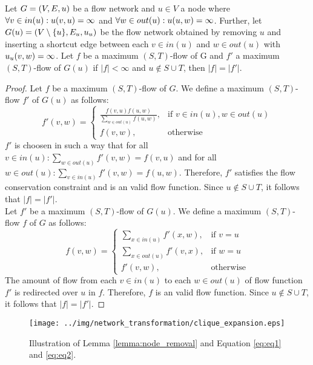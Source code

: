 \begin{lemma}
\label{lemma:node_removal}
Let $G = (V,E,u)$ be a flow network and $u \in V$ a node where
$\forall v \in in(u): u(v,u) = \infty$ and $\forall w \in out(u): u(u,w) = \infty$.
Further, let $G(u) = (V\setminus\{u\}, E_u, u_u)$ be the flow network obtained by removing
$u$ and inserting a shortcut edge between each $v \in in(u)$ and $w \in out(u)$ with $u_u(v,w) = \infty$.
Let $f$ be a maximum $(S,T)$-flow of G and $f'$ a maximum $(S,T)$-flow of
$G(u)$ if $|f| < \infty$ and $u \notin S\cup T$, then $|f| = |f'|$.
\end{lemma}

\begin{proof}
Let $f$ be a maximum $(S,T)$-flow of $G$. We define a maximum $(S,T)$-flow $f'$ 
of $G(u)$ as follows:
\begin{equation}
\label{eq:eq1}
f'(v,w) =  
  \begin{cases}
      \frac{f(v,u)f(u,w)}{\sum_{w \in out(u)} f(u,w)}, & \text{if } v \in in(u), w \in out(u) \\
      f(v,w), & \text{otherwise}
   \end{cases} 
\end{equation}
$f'$ is choosen in such a way that for all $v \in in(u): \sum_{w \in out(u)} f'(v,w) = f(v,u)$
and for all $w \in out(u): \sum_{v \in in(u)} f'(v,w) = f(u,w)$. Therefore, $f'$
satisfies the flow conservation constraint and is an valid flow function. Since
$u \notin S\cup T$, it follows that $|f| = |f'|$. \\
Let $f'$ be a maximum $(S,T)$-flow of $G(u)$. We define a maximum $(S,T)$-flow $f$
of $G$ as follows:
\begin{equation}
\label{eq:eq2}
f(v,w) =  
  \begin{cases}
      \sum_{x \in in(u)} f'(x,w), & \text{if } v = u \\
      \sum_{x \in out(u)} f'(v,x), & \text{if } w = u \\
      f'(v,w), & \text{otherwise}
   \end{cases} 
\end{equation}
The amount of flow from each $v \in in(u)$ to each $w \in out(u)$ of flow function
$f'$ is redirected over $u$ in $f$. Therefore, $f$ is an valid flow function.
Since $u \notin S\cup T$, it follows that $|f| = |f'|$.
\end{proof}

\begin{figure}
\centering
\texttt{[image: ../img/network\_transformation/clique\_expansion.eps]}
\caption{Illustration of Lemma \ref{lemma:node_removal} and Equation \ref{eq:eq1} and \ref{eq:eq2}.}
\label{img:clique_expansion}
\end{figure}

